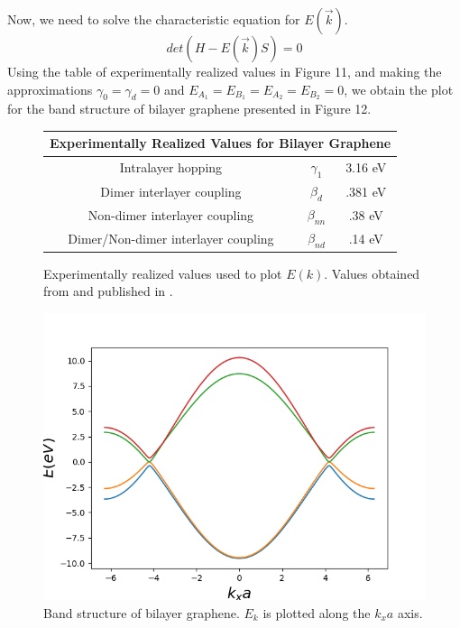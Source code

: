 \documentclass{article}
\begin{document}
Now, we need to solve the characteristic equation for $E(\vec{k})$.
\begin{equation}
det(H - E(\vec{k})S) = 0
\end{equation}
Using the table of experimentally realized values in Figure 11, and making the approximations
$\gamma_{0} = \gamma_{d} = 0$ and $E_{A_{1}} = E_{B_{1}} = E_{A_{2}} = E_{B_{2}} = 0$,  we obtain the
plot for the band structure of bilayer graphene presented in Figure 12.
\begin{figure}[h]

\centering
\begin{tabular}{ |c|c|c|  }
 \hline
 \multicolumn{3}{|c|}{Experimentally Realized Values for Bilayer Graphene} \\
 \hline
 Intralayer hopping   & $\gamma_{1}$   &  3.16 eV\\
 Dimer interlayer coupling & $\beta_{d}$ & .381 eV\\
 Non-dimer interlayer coupling & $\beta_{nn}$ & .38 eV\\
 Dimer/Non-dimer interlayer coupling & $\beta_{nd}$ & .14 eV\\
 \hline
\end{tabular}
\caption{Experimentally realized values used to plot $E(k)$. Values obtained from
\cite{mccann} and published in \cite{kuzmenko}.}
\end{figure}

\begin{figure}[h]
\centering
\includegraphics[scale=.62]{bilayer_band_3}
\caption{Band structure of bilayer graphene. $E_{k}$ is plotted along the $k_{x}a$ axis. }
\end{figure}
\end{document}
